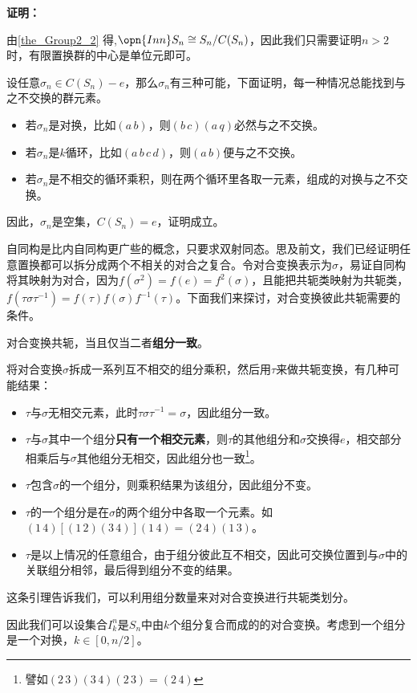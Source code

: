 \textbf{证明：}

由\autoref{the_Group2_2} 得,$\opn{Inn}S_n\cong S_n/C(S_n)$，因此我们只需要证明$n>2$时，有限置换群的中心是单位元即可。

设任意$\sigma_n\in C(S_n)-e$，那么$\sigma_n$有三种可能，下面证明，每一种情况总能找到与之不交换的群元素。

\begin{itemize}
\item 若$\sigma_n$是对换，比如$(a\,b)$，则$(b\,c)(a\,q)$必然与之不交换。
\item 若$\sigma_n$是$k$循环，比如$(a\,b\,c\,d)$，则$(a\,b)$便与之不交换。
\item 若$\sigma_n$是不相交的循环乘积，则在两个循环里各取一元素，组成的对换与之不交换。
\end{itemize}
因此，$\sigma_n$是空集，$C(S_n)=e$，证明成立。

自同构是比内自同构更广些的概念，只要求双射同态。思及前文，我们已经证明任意置换都可以拆分成两个不相关的对合之复合。令对合变换表示为$\sigma$，易证自同构将其映射为对合，因为$f(\sigma^2)=f(e)=f^2(\sigma)$，且能把共轭类映射为共轭类，$f(\tau\sigma\tau^{-1})=f(\tau)f(\sigma)f^{-1}(\tau)$。下面我们来探讨，对合变换彼此共轭需要的条件。


\begin{lemma}{}
对合变换共轭，当且仅当二者\textbf{组分一致}。
\end{lemma}
将对合变换$\sigma$拆成一系列互不相交的组分乘积，然后用$\tau$来做共轭变换，有几种可能结果：
\begin{itemize}
\item $\tau$与$\sigma$无相交元素，此时$\tau\sigma\tau^{-1}=\sigma$，因此组分一致。
\item $\tau$与$\sigma$其中一个组分\textbf{只有一个相交元素}，则$\tau$的其他组分和$\sigma$交换得$e$，相交部分相乘后与$\sigma$其他组分无相交，因此组分也一致\footnote{譬如$(2\,3)(3\,4)(2\,3)=(2\,4)$}。
\item $\tau$包含$\sigma$的一个组分，则乘积结果为该组分，因此组分不变。
\item $\tau$的一个组分是在$\sigma$的两个组分中各取一个元素。如$(1\,4)[(1\,2)(3\,4)](1\,4)=(2\,4)(1\,3)$。
\item $\tau$是以上情况的任意组合，由于组分彼此互不相交，因此可交换位置到与$\sigma$中的关联组分相邻，最后得到组分不变的结果。
\end{itemize}

这条引理告诉我们，可以利用组分数量来对对合变换进行共轭类划分。

因此我们可以设集合$I_k^n$是$S_n$中由$k$个组分复合而成的的对合变换。考虑到一个组分是一个对换，$k\in[0,n/2]$。

